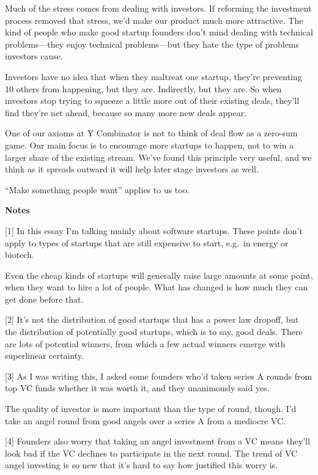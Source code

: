 Much of the stress comes from dealing with investors. If reforming the
investment process removed that stress, we'd make our product much more
attractive. The kind of people who make good startup founders don't mind
dealing with technical problems---they enjoy technical problems---but
they hate the type of problems investors cause.

Investors have no idea that when they maltreat one startup, they're
preventing 10 others from happening, but they are. Indirectly, but they
are. So when investors stop trying to squeeze a little more out of their
existing deals, they'll find they're net ahead, because so many more new
deals appear.

One of our axioms at Y Combinator is not to think of deal flow as a
zero-sum game. Our main focus is to encourage more startups to happen,
not to win a larger share of the existing stream. We've found this
principle very useful, and we think as it spreads outward it will help
later stage investors as well.

``Make something people want'' applies to us too.

\textbf{Notes}

{[}1{]} In this essay I'm talking mainly about software startups. These
points don't apply to types of startups that are still expensive to
start, e.g.~in energy or biotech.

Even the cheap kinds of startups will generally raise large amounts at
some point, when they want to hire a lot of people. What has changed is
how much they can get done before that.

{[}2{]} It's not the distribution of good startups that has a power law
dropoff, but the distribution of potentially good startups, which is to
say, good deals. There are lots of potential winners, from which a few
actual winners emerge with superlinear certainty.

{[}3{]} As I was writing this, I asked some founders who'd taken series
A rounds from top VC funds whether it was worth it, and they unanimously
said yes.

The quality of investor is more important than the type of round,
though. I'd take an angel round from good angels over a series A from a
mediocre VC.

{[}4{]} Founders also worry that taking an angel investment from a VC
means they'll look bad if the VC declines to participate in the next
round. The trend of VC angel investing is so new that it's hard to say
how justified this worry is.

